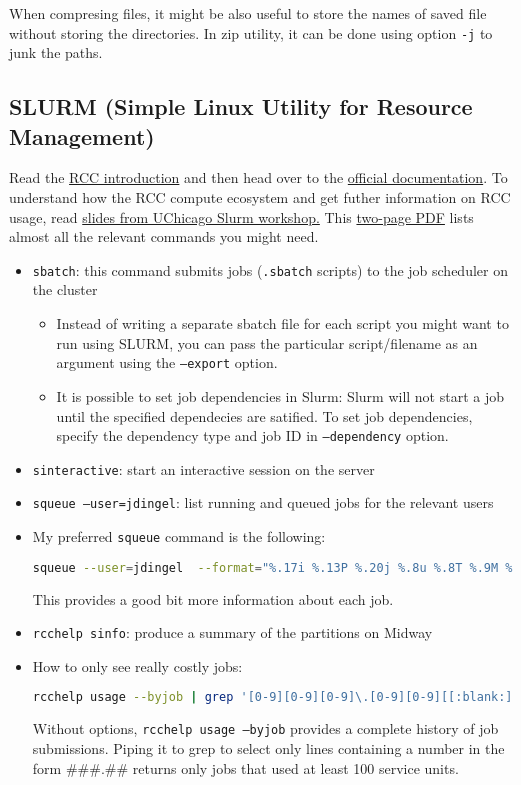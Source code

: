When compresing files, it might be also useful to store the names of saved file without storing the directories.
In zip utility, it can be done using option \texttt{-j} to junk the paths.


\subsection{SLURM (Simple Linux Utility for Resource Management)}

Read the \href{https://rcc.uchicago.edu/docs/using-midway/index.html#batch-jobs}{RCC introduction} and then head over to the \href{https://slurm.schedmd.com/overview.html}{official documentation}.
To understand how the RCC compute ecosystem and get futher information on RCC usage, read \href{https://github.com/rcc-uchicago/SLURM_Workshop_2020/blob/main/Slides/Running_Jobs_at_RCC_fall.pdf}{slides from UChicago Slurm workshop.}
This \href{https://slurm.schedmd.com/pdfs/summary.pdf}{two-page PDF} lists almost all the relevant commands you might need.

\begin{itemize}
	\item \texttt{sbatch}: this command submits jobs (\texttt{.sbatch} scripts) to the job scheduler on the cluster
	\begin{itemize}
		\item Instead of writing a separate sbatch file for each script you might want to run using SLURM, you can pass the particular script/filename as an argument using the \texttt{--export} option.
		\item It is possible to set job dependencies in Slurm: 
		Slurm will not start a job until the specified dependecies are satified.
		To set job dependencies, specify the dependency type and job ID in \texttt{--dependency} option.
	\end{itemize}
	\item \texttt{sinteractive}: start an interactive session on the server
	\item \texttt{squeue --user=jdingel}: list running and queued jobs for the relevant users
	\item My preferred \texttt{squeue} command is the following:
	\begin{lstlisting}[language=bash]
	squeue --user=jdingel  --format="%.17i %.13P %.20j %.8u %.8T %.9M %.9l %.6D %R" #jdjobs
	\end{lstlisting}
	This provides a good bit more information about each job.
	\item \texttt{rcchelp sinfo}: produce a summary of the partitions on Midway
	\item How to only see really costly jobs:
	\begin{lstlisting}[language=bash]
	rcchelp usage --byjob | grep '[0-9][0-9][0-9]\.[0-9][0-9][[:blank:]]|'
	\end{lstlisting}
	Without options, \texttt{rcchelp usage --byjob} provides a complete history of job submissions.
	Piping it to grep to select only lines containing a number in the form \#\#\#.\#\# returns only jobs that used at least 100 service units.
\end{itemize}

